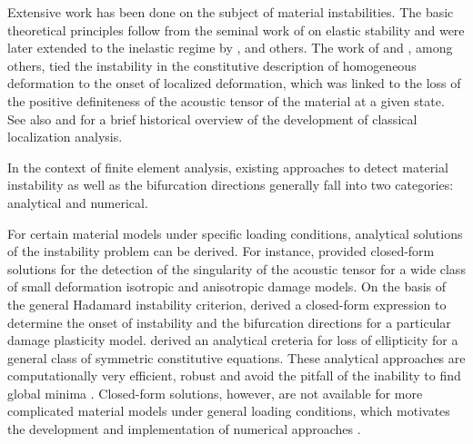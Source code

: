 \documentclass[12pt]{article}
\numberwithin{equation}{section}
\begin{document}
Extensive work has been done on the subject of material instabilities.
The basic theoretical principles follow from the seminal work of
\citet{Hadamard:1903} on elastic stability and were later extended to
the inelastic regime by \citet{Thomas:1961}, \citet{Hill:1962} and
others. The work of \citet{Rudnicki.Riche:1975} and \citet{Rice:1976},
among others, tied the instability in the constitutive description of
homogeneous deformation to the onset of localized deformation, which
was linked to the loss of the positive definiteness of the acoustic
tensor of the material at a given state. See also
\citet*{Armero.Garikipati:1996} and \citet*{Miehe.etal:2004} for a
brief historical overview of the development of classical localization
analysis.

In the context of finite element analysis, existing approaches to
detect material instability as well as the bifurcation directions
generally fall into two categories: analytical and numerical.

For certain material models under specific loading conditions,
analytical solutions of the instability problem can be derived. For
instance, \citet{Oliver.Huespe:2004} provided closed-form solutions
for the detection of the singularity of the acoustic tensor for a wide
class of small deformation isotropic and anisotropic damage models. On
the basis of the general Hadamard instability criterion,
\citet{Xue.Belytschko:2010} derived a closed-form expression to
determine the onset of instability and the bifurcation directions for
a particular damage plasticity model. \citet{Schreyer.Neilsen:1996}
derived an analytical creteria for loss of ellipticity for a general
class of symmetric constitutive equations. These analytical approaches
are computationally very efficient, robust and avoid the pitfall of
the inability to find global minima \cite{Oliver.etal:2010}.
Closed-form solutions, however, are not available for more complicated
material models under general loading conditions, which motivates the
development and implementation of numerical approaches
\cite{Mosler:2005}.
\end{document}
